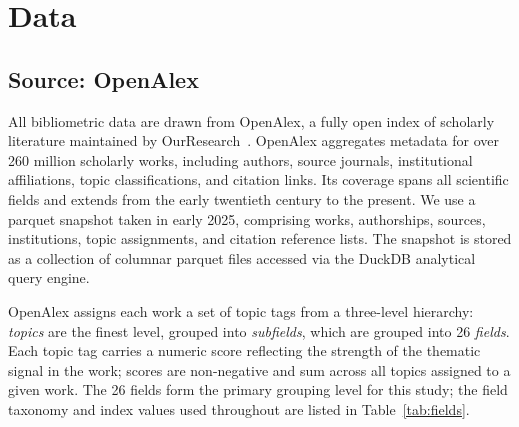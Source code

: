 \section{Data}
\label{sec:data}

\subsection{Source: OpenAlex}

All bibliometric data are drawn from OpenAlex, a fully open index of
scholarly literature maintained by OurResearch~\citep{priem2022openalex}.
OpenAlex aggregates metadata for over 260 million scholarly works, including
authors, source journals, institutional affiliations, topic classifications,
and citation links.  Its coverage spans all scientific fields and extends from
the early twentieth century to the present.  We use a parquet snapshot taken
in early 2025, comprising works, authorships, sources, institutions, topic
assignments, and citation reference lists.  The snapshot is stored as a
collection of columnar parquet files accessed via the DuckDB analytical query
engine.

OpenAlex assigns each work a set of topic tags from a three-level hierarchy:
\emph{topics} are the finest level, grouped into \emph{subfields}, which are
grouped into 26 \emph{fields}.  Each topic tag carries a numeric score
reflecting the strength of the thematic signal in the work; scores are
non-negative and sum across all topics assigned to a given work.  The 26 fields
form the primary grouping level for this study; the field taxonomy and
index values used throughout are listed in Table~\ref{tab:fields}.

